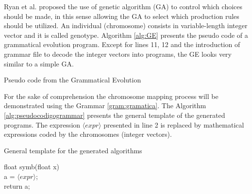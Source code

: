 \documentclass[conference]{IEEEtran}
\begin{document}
Ryan et al. \cite{ryan1998grammatical}  proposed the use of genetic algorithm (GA) to control which choices should be made, in this sense allowing the GA to select which production rules should be utilized. An individual (chromosome) consists in variable-length integer vector and it is called genotype. Algorithm \ref{alg:GE} presents the pseudo code of a grammatical evolution program. Except for lines 11, 12 and the introduction of grammar file to decode the integer vectors into programs, the GE looks very similar to a simple GA.

\begin{algorithm}[htb]
	\fontsize{8pt}{10pt}\selectfont
	\caption{Pseudo code from the Grammatical Evolution}
	\label{alg:GE}
\end{algorithm}


For the sake of comprehension the chromosome mapping process will be demonstrated using the Grammar \ref{gram:gramatica}. The Algorithm \ref{alg:pseudocodigogrammar} presents the general template of the generated programs. The expression $\langle expr \rangle$ presented in line 2 is replaced by mathematical expressions coded by the chromosomes (integer vectors).


\begin{algorithm}
	\caption{General template for the generated algorithms}
	\label{alg:pseudocodigogrammar}
	float symb(float x) { \\
		a = $\langle expr \rangle$;   \\
		return a;  \\
	}	
\end{algorithm}
\end{document}
